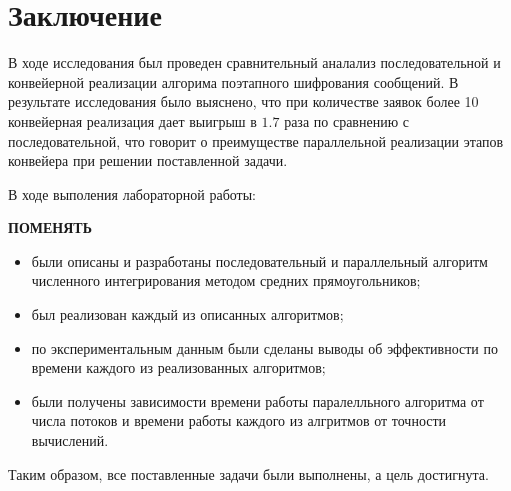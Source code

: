 \chapter*{Заключение}

В ходе исследования был проведен сравнительный аналализ последовательной и
конвейерной реализации алгорима поэтапного шифрования сообщений. В результате
исследования было выяснено, что при количестве заявок более 10 конвейерная
реализация дает выигрыш в $1.7$ раза по сравнению с последовательной, что 
говорит о преимуществе параллельной реализации этапов конвейера при решении
поставленной задачи.

В ходе выполения лабораторной работы:

\textbf{ПОМЕНЯТЬ}
\begin{itemize}[left=\parindent]
    \item были описаны и разработаны последовательный и параллельный алгоритм
          численного интегрирования методом средних прямоугольников;
    \item был реализован каждый из описанных алгоритмов;
    \item по экспериментальным данным были сделаны выводы об эффективности по
          времени каждого из реализованных алгоритмов;
    \item были получены зависимости времени работы паралелльного алгоритма
          от числа потоков и времени работы каждого из алгритмов от
          точности вычислений.
\end{itemize}

Таким образом, все поставленные задачи были выполнены, а цель достигнута.
